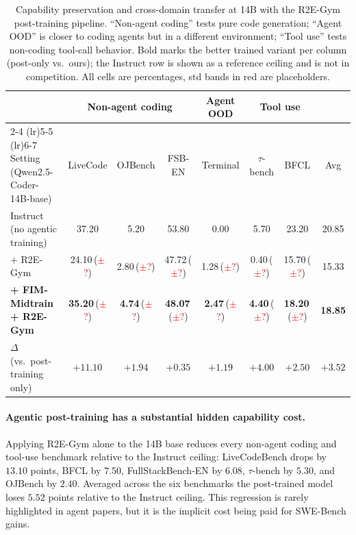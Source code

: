 \begin{table}[t]
\centering
\caption{Capability preservation and cross-domain transfer at 14B with the
R2E-Gym post-training pipeline. ``Non-agent coding'' tests pure code
generation; ``Agent OOD'' is closer to coding agents but in a different
environment; ``Tool use'' tests non-coding tool-call behavior. Bold marks
the better trained variant per column (post-only vs.\ ours); the Instruct
row is shown as a reference ceiling and is not in competition. All cells
are percentages, std bands in red are placeholders.}
\label{tab:cap}
\small
\setlength{\tabcolsep}{4pt}
\begin{tabular}{lcccccc|c}
\toprule
& \multicolumn{3}{c}{Non-agent coding}
& \multicolumn{1}{c}{Agent OOD}
& \multicolumn{2}{c}{Tool use}
& \\
\cmidrule(lr){2-4} \cmidrule(lr){5-5} \cmidrule(lr){6-7}
Setting (Qwen2.5-Coder-14B-base)
& LiveCode & OJBench & FSB-EN
& Terminal
& $\tau$-bench & BFCL
& Avg \\
\midrule
Instruct (no agentic training)
  & 37.20 & 5.20 & 53.80
  & 0.00
  & 5.70 & 23.20
  & 20.85 \\
+ R2E-Gym
  & 24.10\,(\textcolor{red}{$\pm$?})
  & 2.80\,(\textcolor{red}{$\pm$?})
  & 47.72\,(\textcolor{red}{$\pm$?})
  & 1.28\,(\textcolor{red}{$\pm$?})
  & 0.40\,(\textcolor{red}{$\pm$?})
  & 15.70\,(\textcolor{red}{$\pm$?})
  & 15.33 \\
\textbf{+ FIM-Midtrain + R2E-Gym}
  & \textbf{35.20}\,(\textcolor{red}{$\pm$?})
  & \textbf{4.74}\,(\textcolor{red}{$\pm$?})
  & \textbf{48.07}\,(\textcolor{red}{$\pm$?})
  & \textbf{2.47}\,(\textcolor{red}{$\pm$?})
  & \textbf{4.40}\,(\textcolor{red}{$\pm$?})
  & \textbf{18.20}\,(\textcolor{red}{$\pm$?})
  & \textbf{18.85} \\
\rowcolor{blue!8}
$\Delta$ (vs.\ post-training only)
  & $+11.10$ & $+1.94$ & $+0.35$
  & $+1.19$
  & $+4.00$ & $+2.50$
  & $+3.52$ \\
\bottomrule
\end{tabular}
\end{table}

\paragraph{Agentic post-training has a substantial hidden capability cost.}
Applying R2E-Gym alone to the 14B base reduces every non-agent coding and
tool-use benchmark relative to the Instruct ceiling: LiveCodeBench drops
by $13.10$ points, BFCL by $7.50$, FullStackBench-EN by $6.08$,
$\tau$-bench by $5.30$, and OJBench by $2.40$. Averaged across the six
benchmarks the post-trained model loses $5.52$ points relative to the
Instruct ceiling. This regression is rarely highlighted in agent papers,
but it is the implicit cost being paid for SWE-Bench gains.

